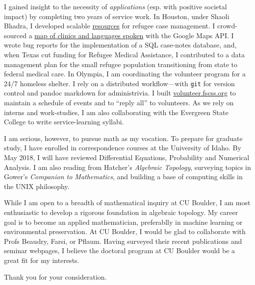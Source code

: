 \documentclass{article}
\begin{document}
I gained insight to the necessity of \emph{applications} (esp. with
positive societal impact) by completing two years of service work.
In Houston, under Shaoli Bhadra, I developed scalable
\href{https://github.com/coltongrainger/ymca-resources}{resources} for
refugee case management. I crowd-sourced a
\href{https://drive.google.com/open?id=1kk9yn6-4nifHLIf2tGYbW_7PiYo\&usp=sharing}{map
of clinics and languages spoken} with the Google Maps API. I wrote bug
reports for the implementation of a SQL case-notes database, and, when
Texas cut funding for Refugee Medical Assistance, I contributed to a
data management plan for the small refugee population transitioning from 
state to federal medical care. In Olympia, I am coordinating the volunteer program for a
24/7 homeless shelter. I rely on a distributed workflow---with \texttt{git} for version control and
pandoc markdown for administrivia. I built
\href{http://volunteer.fscss.org}{volunteer.fscss.org} to maintain a
schedule of events and to ``reply all'' to volunteers. As we rely on
interns and work-studies, I am also collaborating with the 
Evergreen State College to write service-learning syllabi. 

I am serious, however, to pursue math as my vocation. To prepare for graduate 
study, I have enrolled in correspondence courses at the University of Idaho.
By May 2018, I will have reviewed Differential Equations,  
Probability and Numerical Analysis. I am also reading from 
Hatcher's \emph{Algebraic Topology}, surveying topics in Gower's \emph{Companion to Mathematics},
and building a base of computing skills in the UNIX philosophy. 

While I am open to a breadth of mathematical inquiry at CU Boulder, 
I am most enthusiastic to develop a rigorous foundation in algebraic topology.
My career goal is to become an applied mathematician, preferablly in machine learning 
or environmental preservation. At CU Boulder, I would be glad to collaborate with
Profs Beaudry, Farsi, or Pflaum. Having surveyed their recent publications and seminar 
webpages, I believe the doctoral program at CU Boulder would be a great fit for my
interests.

Thank you for your consideration. 
\end{document}
